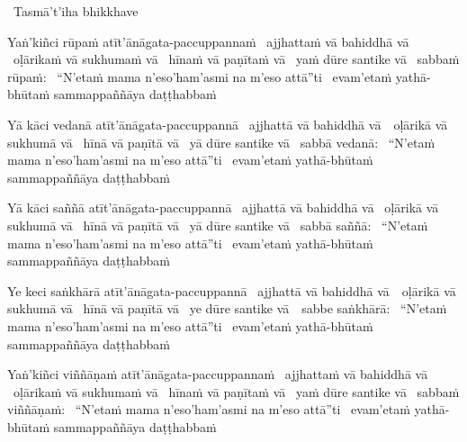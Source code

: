 \ifasixversion\clearpage\fi

\begin{pali-leader}
  \anglebracketleft\ \hspace{-0.5mm}Tasmā't'iha bhikkhave \hspace{-0.5mm}\anglebracketright\
\end{pali-leader}
\begin{pali-hangtogether}
  Yaṅ'kiñci rūpaṁ atīt'ānāgata-paccuppannaṁ \breathmark\ ajjhattaṁ vā bahiddhā vā \breathmark\ oḷārikaṁ vā sukhumaṁ vā \breathmark\ hīnaṁ vā paṇītaṁ vā \breathmark\ yaṁ dūre santike vā \breathmark\ sabbaṁ rūpaṁ: \breathmark\ ``N'etaṁ mama n'eso'ham'asmi na m'eso attā''ti \breathmark\ evam'etaṁ yathā-bhūtaṁ sammappaññāya daṭṭhabbaṁ
\end{pali-hangtogether}

\begin{pali-hang}
  Yā kāci vedanā atīt'ānāgata-paccuppannā \breathmark\ ajjhattā vā bahiddhā \mbox{vā}~\breathmark\ oḷārikā vā sukhumā vā \breathmark\ hīnā vā paṇītā vā \breathmark\ yā dūre santike vā \breathmark\ sabbā vedanā: \breathmark\ ``N'etaṁ mama n'eso'ham'asmi na m'eso attā''ti \breathmark\ evam'etaṁ yathā-bhūtaṁ sammappaññāya daṭṭhabbaṁ
\end{pali-hang}

\begin{pali-hang}
  Yā kāci saññā atīt'ānāgata-paccuppannā \breathmark\ ajjhattā vā bahiddhā vā \breathmark\ oḷārikā vā sukhumā vā \breathmark\ hīnā vā paṇītā vā \breathmark\ yā dūre santike vā \breathmark\ sabbā saññā: \breathmark\ ``N'etaṁ mama n'eso'ham'asmi na m'eso attā''ti \breathmark\ evam'etaṁ yathā-bhūtaṁ sammappaññāya daṭṭhabbaṁ
\end{pali-hang}

\begin{pali-hang}
  Ye keci saṅkhārā atīt'ānāgata-paccuppannā \breathmark\ ajjhattā vā bahiddhā \mbox{vā}~\breathmark\ oḷārikā vā sukhumā vā \breathmark\ hīnā vā paṇītā vā \breathmark\ ye dūre santike \mbox{vā}~\breathmark\ sabbe saṅkhārā: \breathmark\ ``N'etaṁ mama n'eso'ham'asmi na m'eso attā''ti \breathmark\ evam'etaṁ yathā-bhūtaṁ sammappaññāya daṭṭhabbaṁ
\end{pali-hang}

\begin{pali-hang}
  Yaṅ'kiñci viññāṇaṁ atīt'ānāgata-paccuppannaṁ \breathmark\ ajjhattaṁ vā bahiddhā vā \breathmark\ oḷārikaṁ vā sukhumaṁ vā \breathmark\ hīnaṁ vā paṇītaṁ vā \breathmark\ yaṁ dūre santike vā \breathmark\ sabbaṁ viññāṇaṁ: \breathmark\ ``N'etaṁ mama n'eso'ham'asmi na m'eso attā''ti \breathmark\ evam'etaṁ yathā-bhūtaṁ sammappaññāya daṭṭhabbaṁ
\end{pali-hang}

